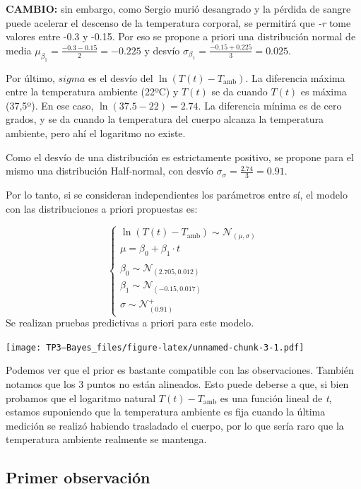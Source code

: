 \documentclass[
]{article}
\begin{document}
\textbf{CAMBIO:} sin embargo, como Sergio murió desangrado y la pérdida
de sangre puede acelerar el descenso de la temperatura corporal, se
permitirá que \emph{-r} tome valores entre -0.3 y -0.15. Por eso se
propone a priori una distribución normal de media
\(\mu_{\beta_1} = \frac{-0.3-0.15}{2} = -0.225\) y desvío
\(\sigma_{\beta_1} = \frac{-0.15+0.225}{3} = 0.025\).

Por último, \(sigma\) es el desvío del \(\ln(T(t) - T_{\mathrm{amb}})\).
La diferencia máxima entre la temperatura ambiente (22ºC) y \(T(t)\) se
da cuando \(T(t)\) es máxima (37,5º). En ese caso,
\(\ln(37.5-22)=2.74\). La diferencia mínima es de cero grados, y se da
cuando la temperatura del cuerpo alcanza la temperatura ambiente, pero
ahí el logaritmo no existe.

Como el desvío de una distribución es estrictamente positivo, se propone
para el mismo una distribución Half-normal, con desvío
\(\sigma_\sigma = \frac{2.74}{3} = 0.91\).

Por lo tanto, si se consideran independientes los parámetros entre sí,
el modelo con las distribuciones a priori propuestas es:

\[
\begin{cases}
\ln(T(t) - T_{\mathrm{amb}}) \sim\mathcal{N}_{(\mu, \sigma)} \\
\mu = \beta_{0} + \beta_{1}\cdot t \\
\\
\beta_0 \sim \mathcal{N}_{(2.705, 0.012)} \\
\beta_1 \sim \mathcal{N}_{(-0.15, 0.017)} \\
\sigma \sim \mathcal{N}^{+}_{(0.91)}
\end{cases}
\] Se realizan pruebas predictivas a priori para este modelo.

\texttt{[image: TP3---Bayes\_files/figure-latex/unnamed-chunk-3-1.pdf]}

Podemos ver que el prior es bastante compatible con las observaciones.
También notamos que los 3 puntos no están alineados. Esto puede deberse
a que, si bien probamos que el logaritmo natural
\(T(t) - T_{\mathrm{amb}}\) es una función lineal de \emph{t}, estamos
suponiendo que la temperatura ambiente es fija cuando la última medición
se realizó habiendo trasladado el cuerpo, por lo que sería raro que la
temperatura ambiente realmente se mantenga.

\hypertarget{primer-observaciuxf3n}{%
\subsection{Primer observación}\label{primer-observaciuxf3n}}
\end{document}
